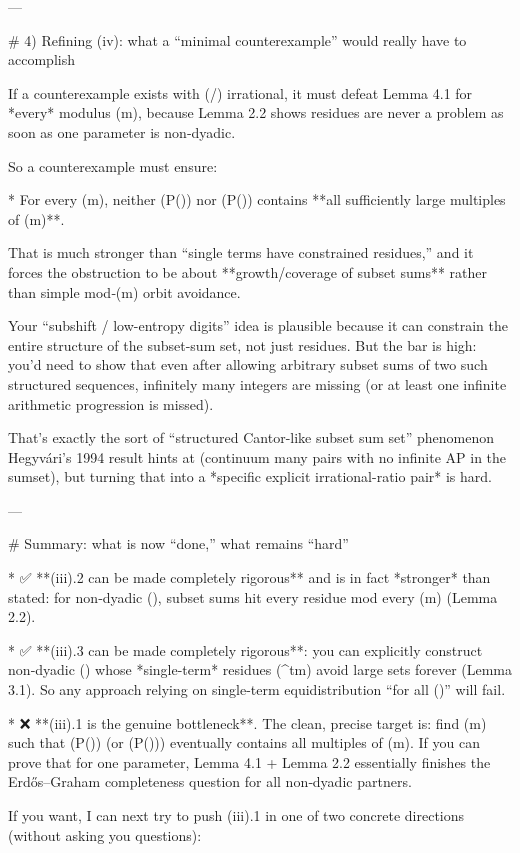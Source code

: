 ---

# 4) Refining (iv): what a “minimal counterexample” would really have to accomplish

If a counterexample exists with (\alpha/\beta) irrational, it must defeat Lemma 4.1 for *every* modulus (m), because Lemma 2.2 shows residues are never a problem as soon as one parameter is non‑dyadic.

So a counterexample must ensure:

* For every (m), neither (P(\alpha)) nor (P(\beta)) contains **all sufficiently large multiples of (m)**.

That is much stronger than “single terms have constrained residues,” and it forces the obstruction to be about **growth/coverage of subset sums** rather than simple mod‑(m) orbit avoidance.

Your “subshift / low-entropy digits” idea is plausible because it can constrain the entire structure of the subset-sum set, not just residues. But the bar is high: you’d need to show that even after allowing arbitrary subset sums of two such structured sequences, infinitely many integers are missing (or at least one infinite arithmetic progression is missed).

That’s exactly the sort of “structured Cantor-like subset sum set” phenomenon Hegyvári’s 1994 result hints at (continuum many pairs with no infinite AP in the sumset), but turning that into a *specific explicit irrational-ratio pair* is hard.

---

# Summary: what is now “done,” what remains “hard”

* ✅ **(iii).2 can be made completely rigorous** and is in fact *stronger* than stated: for non‑dyadic (\beta), subset sums hit every residue mod every (m) (Lemma 2.2).

* ✅ **(iii).3 can be made completely rigorous**: you can explicitly construct non‑dyadic (\beta) whose *single-term* residues (^t\beta\rfloor\bmod m) avoid large sets forever (Lemma 3.1). So any approach relying on single-term equidistribution “for all (\beta)” will fail.

* ❌ **(iii).1 is the genuine bottleneck**. The clean, precise target is:
  find (m) such that (P(\alpha)) (or (P(\beta))) eventually contains all multiples of (m). If you can prove that for one parameter, Lemma 4.1 + Lemma 2.2 essentially finishes the Erdős–Graham completeness question for all non‑dyadic partners.

If you want, I can next try to push (iii).1 in one of two concrete directions (without asking you questions):

